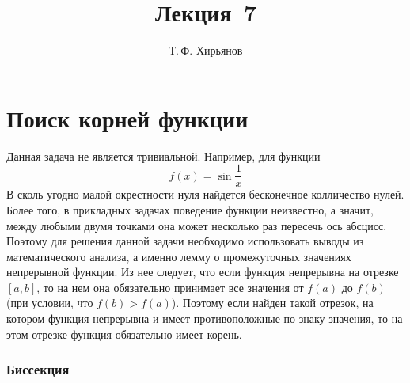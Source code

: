 \documentclass[a4paper, fleqn]{article}
\title{Лекция \textnumero\,7}
\author{Т.\,Ф. Хирьянов}
\date{}
\begin{document}
	\maketitle

\section*{Поиск корней функции}

Данная задача не является тривиальной. Например, для функции
\[f(x) = \sin{\frac{1}{x}}\]
В сколь угодно малой окрестности нуля найдется бесконечное колличество нулей. Более того, в прикладных задачах поведение функции неизвестно, а значит, между любыми двумя точками она может несколько раз пересечь ось абсцисс. Поэтому для решения данной задачи необходимо использовать выводы из математического анализа, а именно лемму о промежуточных значениях непрерывной функции. Из нее следует, что если функция непрерывна на отрезке $[a, b]$, то на нем она обязательно принимает все значения от $f(a)$ до $f(b)$ (при условии, что $f(b) > f(a)$). Поэтому если найден такой отрезок, на котором функция непрерывна и имеет противоположные по знаку значения, то на этом отрезке функция обязательно имеет корень.

\subsubsection*{Биссекция}
\end{document}
